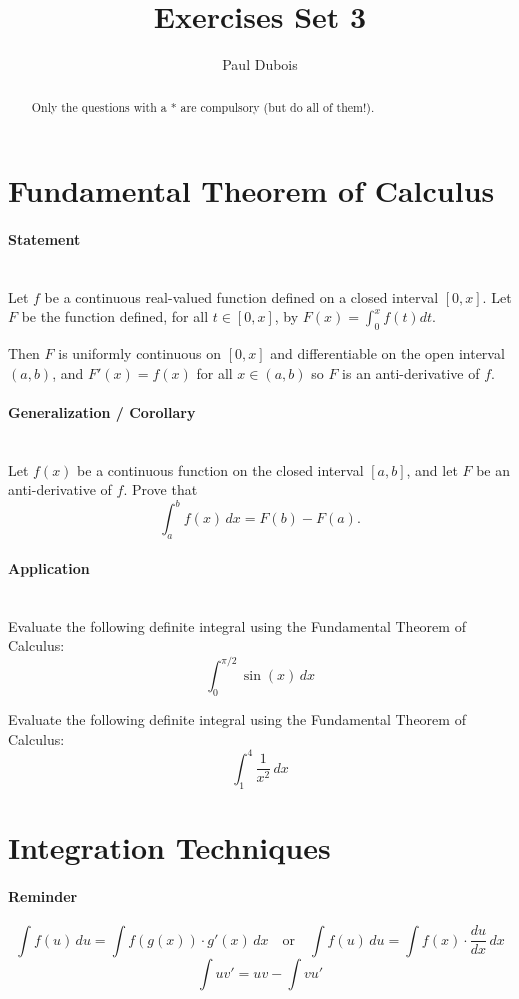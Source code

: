 \documentclass[]{article}
\title{Exercises Set 3}
\author{Paul Dubois}
\begin{document}
	\maketitle
	
	\begin{abstract}
		Only the questions with a * are compulsory (but do all of them!).
	\end{abstract}
	
	\section{Fundamental Theorem of Calculus}
	\paragraph{Statement}\mbox{}\\
	Let $f$ be a continuous real-valued function defined on a closed interval $\left[ 0,x \right]$.
	Let $F$ be the function defined, for all $t \in \left[ 0,x \right]$, by $F(x) = \int_0^x f(t) dt$.
	
	Then $F$ is uniformly continuous on $\left[ 0,x \right]$ and differentiable on the open interval $\left( a,b \right)$, and $F'(x) = f(x)$ for all $x \in \left( a,b \right)$ so $F$ is an anti-derivative of $f$.
	
	\paragraph{Generalization / Corollary}\mbox{}\\
	Let \( f(x) \) be a continuous function on the closed interval \([a, b]\), and let \( F \) be an anti-derivative of \( f \).
	Prove that
	\[
	\int_a^b f(x) \, dx = F(b) - F(a).
	\]
	
	\paragraph{Application}\mbox{}\\
	Evaluate the following definite integral using the Fundamental Theorem of Calculus:
	\[
	\int_0^{\pi/2} \sin(x) \, dx
	\]
	
	Evaluate the following definite integral using the Fundamental Theorem of Calculus:
	\[
	\int_1^4 \frac{1}{x^2} \, dx
	\]
	
	
	\section{Integration Techniques}
	\paragraph{Reminder}
	$$\int f(u) \, du = \int f(g(x)) \cdot g'(x) \, dx \quad \text {or} \quad \int f(u) \, du = \int f(x) \cdot \frac{du}{dx} \, dx$$
	$$\int u v' = uv - \int v u'$$
	
\end{document}
